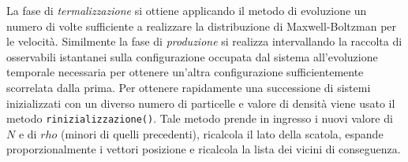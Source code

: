 \documentclass[11pt]{article}
\theoremstyle{plain}
\theoremstyle{remark}
\newcommand{\cd}[1]{\texttt{#1}}
\begin{document}
\medskip\newline
La fase di \emph{termalizzazione} si ottiene applicando il metodo di evoluzione un numero di volte sufficiente a realizzare la distribuzione di Maxwell-Boltzman per le velocità.
\medskip\newline
Similmente la fase di \emph{produzione} si realizza intervallando la raccolta di osservabili istantanei sulla configurazione occupata dal sistema all'evoluzione temporale necessaria per ottenere un'altra configurazione sufficientemente scorrelata dalla prima.
\medskip\newline
Per ottenere rapidamente una successione di sistemi inizializzati con un diverso numero di particelle e valore di densità viene usato il metodo \cd{rinizializzazione()}. Tale metodo prende in ingresso i nuovi valore di $N$ e di $rho$ (minori di quelli precedenti), ricalcola il lato della scatola, espande proporzionalmente i vettori posizione e ricalcola la lista dei vicini di conseguenza.



\clearpage
\end{document}
